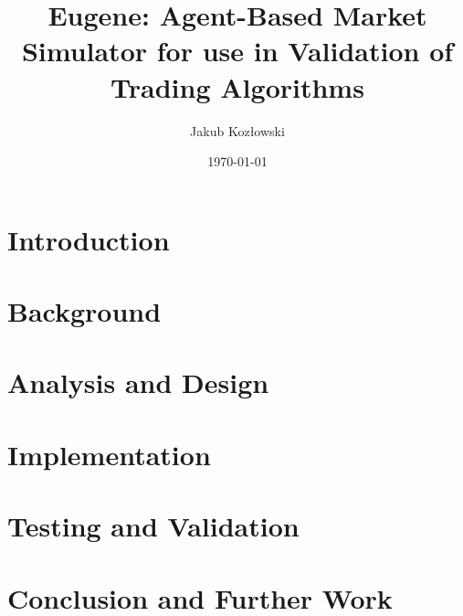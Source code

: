 \documentclass{report}
\title{Eugene: Agent-Based Market Simulator for use in Validation of Trading Algorithms}
\author{Jakub Koz\l owski}
\date{\today}
\begin{document}
\maketitle

\tableofcontents

\pagestyle{fancy}

\chapter{Introduction}
\label{introduction}





\chapter{Background}
\label{background}

\chapter{Analysis and Design}
\label{analysis-and-design}

\chapter{Implementation}
\label{implementation}

\chapter{Testing and Validation}
\label{testing}

\chapter{Conclusion and Further Work}
\label{conclusion}
\end{document}
